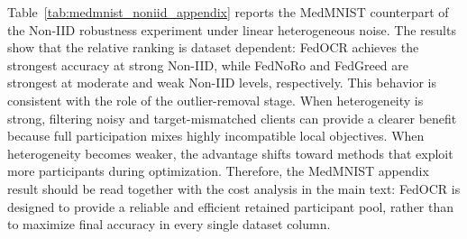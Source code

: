 Table~\ref{tab:medmnist_noniid_appendix} reports the MedMNIST counterpart of the Non-IID robustness experiment under linear heterogeneous noise.
The results show that the relative ranking is dataset dependent: FedOCR achieves the strongest accuracy at strong Non-IID, while FedNoRo and FedGreed are strongest at moderate and weak Non-IID levels, respectively.
This behavior is consistent with the role of the outlier-removal stage.
When heterogeneity is strong, filtering noisy and target-mismatched clients can provide a clearer benefit because full participation mixes highly incompatible local objectives.
When heterogeneity becomes weaker, the advantage shifts toward methods that exploit more participants during optimization.
Therefore, the MedMNIST appendix result should be read together with the cost analysis in the main text: FedOCR is designed to provide a reliable and efficient retained participant pool, rather than to maximize final accuracy in every single dataset column.


